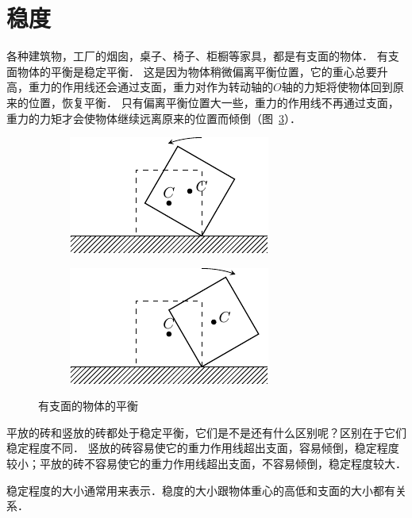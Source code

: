 \section{稳度}
各种建筑物，工厂的烟囱，桌子、椅子、柜橱等家具，都是有支面的物体．
有支面物体的平衡是稳定平衡．
这是因为物体稍微偏离平衡位置，它的重心总要升高，重力的作用线还会通过支面，重力对作为转动轴的$O$轴的力矩将使物体回到原来的位置，恢复平衡．
只有偏离平衡位置大一些，重力的作用线不再通过支面，重力的力矩才会使物体继续远离原来的位置而倾倒（图~\ref{fig_A_6-18}）．
\begin{figure}[htbp]
    \centering
    \begin{subfigure} {0.49\linewidth} 
        \centering
        \includegraphics{fig/A/6-18a.pdf} 
        \caption{}\label{fig_A_6-18a} 
    \end{subfigure}
    \begin{subfigure} {0.49\linewidth} 
        \centering
        \includegraphics{fig/A/6-18b.pdf} 
        \caption{}\label{fig_A_6-18b} 
    \end{subfigure}
    \caption{有支面的物体的平衡}\label{fig_A_6-18}
\end{figure}

平放的砖和竖放的砖都处于稳定平衡，它们是不是还有什么区别呢？区别在于它们稳定程度不同．
竖放的砖容易使它的重力作用线超出支面，容易倾倒，稳定程度较小；平放的砖不容易使它的重力作用线超出支面，不容易倾倒，稳定程度较大．

稳定程度的大小通常用来表示．稳度的大小跟物体重心的高低和支面的大小都有关系．


